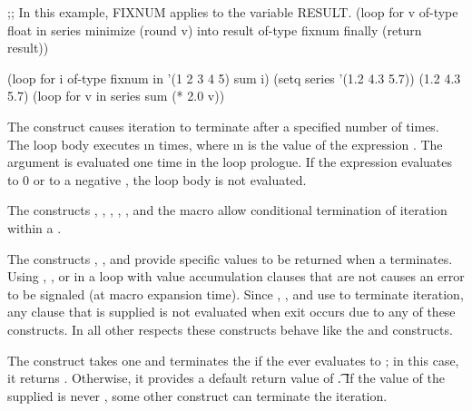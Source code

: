 ;; In this example, FIXNUM applies to the variable RESULT.
 (loop for v of-type float in series
       minimize (round v) into result of-type fixnum
       finally (return result))
\endcode

\endsubsubsection%


\code
 (loop for i of-type fixnum in '(1 2 3 4 5)
       sum i)
 (setq series '(1.2 4.3 5.7))
\EV (1.2 4.3 5.7)
 (loop for v in series 
       sum (* 2.0 v))
\endcode

\endsubsubsection%

\endsubsection%


The  construct causes iteration to terminate after a
specified number of times.
 The loop body executes \i{n} times, where \i{n} is the value 
of the expression .  The  argument is evaluated one time
in the loop prologue.  If the expression evaluates to 0 or 
to a negative , the loop body is not evaluated.

The constructs ,
,
,
,
,
and the macro 
allow conditional termination of iteration within
a .

The constructs , , and  provide
specific values to be returned when a  terminates.  
Using , , or  in a loop with 
value accumulation clauses that are not  causes 
an error  to be signaled (at macro expansion time).
Since , , and 
use 
to terminate iteration,
any  clause that is supplied is not evaluated
when exit occurs due to any of these constructs.
In all other respects these
constructs behave like the  and  constructs.

  The  construct takes one  and terminates the 
  if the  ever evaluates to \nil; in this case, it returns
  \nil.  Otherwise, it provides a default return value of \t.
If the value of the supplied  is never \nil, some other construct
can terminate the iteration.
 
